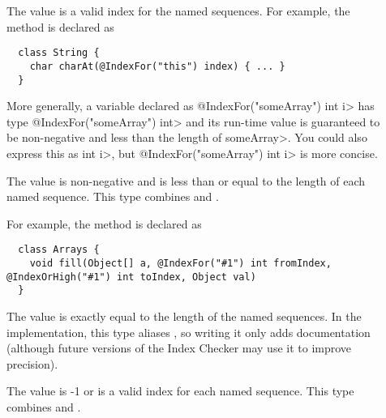 \begin{description}
\item[]
  The value is a valid index for the named sequences.  For example, the
  method is declared as

  \begin{Verbatim}
  class String {
    char charAt(@IndexFor("this") index) { ... }
  }
  \end{Verbatim}

  More generally, a variable
  declared as \<@IndexFor("someArray") int i> has type
  \<@IndexFor("someArray") int> and its run-time value is guaranteed to be
  non-negative and less than the length of \<someArray>.  You could also
  express this as
  \<
  int i>,
  but \<@IndexFor("someArray") int i> is more concise.

 \item[]
   The value is non-negative and is less than or equal to the length of
   each named sequence.  This type combines
   and
  .

  For example, the
   method is declared as

  \begin{mysmall}
  \begin{Verbatim}
  class Arrays {
    void fill(Object[] a, @IndexFor("#1") int fromIndex, @IndexOrHigh("#1") int toIndex, Object val)
  }
  \end{Verbatim}
  \end{mysmall}

 \item[]
   The value is exactly equal to the length of the named
   sequences. In the implementation, this type aliases
   , so writing it
   only adds documentation (although future versions of the Index Checker
   may use it to improve precision).

 \item[]
   The value is -1 or is a valid index for
   each named sequence.  This type combines
   and
  .


\end{description}
